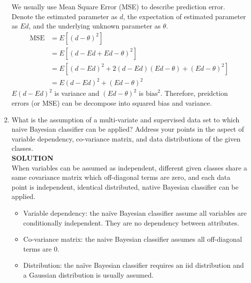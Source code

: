 \documentclass{article}
\begin{document}
\begin{enumerate}
    We usually use Mean Square Error (MSE) to describe prediction error. Denote the estimated parameter as $d$, the expectation of estimated parameter as $Ed$, and the underlying unknown parameter as $\theta$.
    $$
    \begin{aligned}
        \text{MSE}&=E\left[(d-\theta)^2\right]\\
        &= E\left[(d-Ed+Ed-\theta)^2\right]\\
        &= E\left[(d-Ed)^2 + 2(d-Ed)(Ed-\theta)+(Ed-\theta)^2\right]\\
        &= E(d-Ed)^2 + (Ed-\theta)^2
    \end{aligned}
    $$
    $E(d-Ed)^2$ is variance and $(Ed-\theta)^2$ is $\text{bias}^2$. Therefore, preidction errors (or MSE) can be decompose into squared bias and variance.
    \item What is the assumption of a multi-variate and supervised data set to which naive Bayesian classifier can be applied? Address your points in the aspect of variable dependency, co-variance matrix, and data distributions of the given classes.\\
    \textbf{SOLUTION}\\
    When variables can be assumed as independent, different given classes share a same covariance matrix which off-diagonal terms are zero, and each data point is independent, identical distributed, native Bayesian classifier can be applied.
\begin{itemize}
    \item Variable dependency: the naïve Bayesian classifier assume all variables are conditionally independent. They are no dependency between attributes.
    \item Co-variance matrix: the naive Bayesian classifier assumes all off-diagonal terms are 0.
    \item Distribution: the naïve Bayesian classifier requires an iid distribution and a Gaussian distribution is usually assumed.
\end{itemize}


\end{enumerate}
\end{document}
